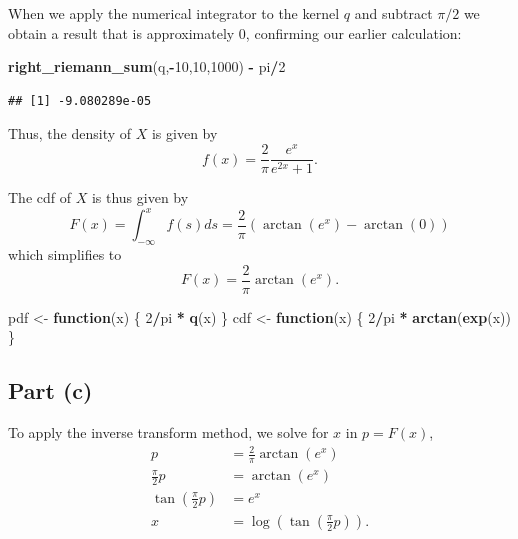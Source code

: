 \documentclass[
  11pt,
]{article}
\newenvironment{Shaded}{\begin{snugshade}}{\end{snugshade}}
\newcommand{\ControlFlowTok}[1]{\textcolor[rgb]{0.13,0.29,0.53}{\textbf{#1}}}
\newcommand{\DecValTok}[1]{\textcolor[rgb]{0.00,0.00,0.81}{#1}}
\newcommand{\FunctionTok}[1]{\textcolor[rgb]{0.13,0.29,0.53}{\textbf{#1}}}
\newcommand{\NormalTok}[1]{#1}
\newcommand{\OtherTok}[1]{\textcolor[rgb]{0.56,0.35,0.01}{#1}}
\newcommand{\SpecialCharTok}[1]{\textcolor[rgb]{0.81,0.36,0.00}{\textbf{#1}}}
\begin{document}
When we apply the numerical integrator to the kernel \(q\) and subtract
\(\pi/2\) we obtain a result that is approximately \(0\), confirming our
earlier calculation:

\begin{Shaded}
\begin{Highlighting}[]
\FunctionTok{right\_riemann\_sum}\NormalTok{(q,}\SpecialCharTok{{-}}\DecValTok{10}\NormalTok{,}\DecValTok{10}\NormalTok{,}\DecValTok{1000}\NormalTok{) }\SpecialCharTok{{-}}\NormalTok{ pi}\SpecialCharTok{/}\DecValTok{2}
\end{Highlighting}
\end{Shaded}

\begin{verbatim}
## [1] -9.080289e-05
\end{verbatim}

Thus, the density of \(X\) is given by \[
  f(x) = \frac{2}{\pi} \frac{e^x}{e^{2x}+1}.
\]

The cdf of \(X\) is thus given by \[
  F(x) = \int_{-\infty}^{x} f(s) ds = \frac{2}{\pi} (\operatorname{arctan}(e^x) - \operatorname{arctan}(0))
\] which simplifies to \[
  F(x) = \frac{2}{\pi} \operatorname{arctan}(e^x).
\]

\begin{Shaded}
\begin{Highlighting}[]
\NormalTok{pdf }\OtherTok{\textless{}{-}} \ControlFlowTok{function}\NormalTok{(x) \{ }\DecValTok{2}\SpecialCharTok{/}\NormalTok{pi }\SpecialCharTok{*} \FunctionTok{q}\NormalTok{(x) \}}
\NormalTok{cdf }\OtherTok{\textless{}{-}} \ControlFlowTok{function}\NormalTok{(x) \{ }\DecValTok{2}\SpecialCharTok{/}\NormalTok{pi }\SpecialCharTok{*} \FunctionTok{arctan}\NormalTok{(}\FunctionTok{exp}\NormalTok{(x)) \}}
\end{Highlighting}
\end{Shaded}

\hypertarget{part-c}{%
\subsection{Part (c)}\label{part-c}}


To apply the inverse transform method, we solve for \(x\) in
\(p = F(x)\), \begin{align}
  p                                 &= \frac{2}{\pi} \operatorname{arctan}(e^x)\\
  \frac{\pi}{2} p                   &= \operatorname{arctan}(e^x)\\
  \tan\left(\frac{\pi}{2} p\right)  &= e^x\\
  x                                 &= \log\left(\tan\left(\frac{\pi}{2} p\right)\right).
\end{align}
\end{document}
